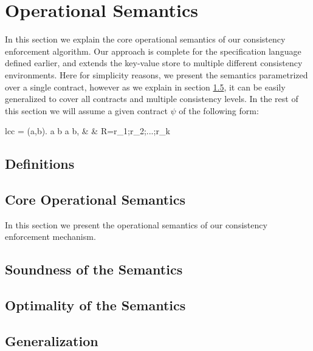 %
%
\section{Operational Semantics}

In this section we explain the core operational semantics of our
consistency enforcement algorithm. 
Our approach is complete for the specification language defined earlier,
and extends the key-value store to multiple different consistency
environments. Here for simplicity reasons, we present the semantics 
parametrized over a single contract,
however as we explain in section \ref{subsec:generalization}, it can be easily
generalized to cover all contracts and multiple consistency levels. In
the rest of this section we will assume a given contract $\psi$ of the
following form:
	\begin{smathpar}
	\begin{array}{lcc}
		\psi = \forall (a,b). a  b  \Rightarrow a
		 b, & \spc & R=r_1;r_2;...;r_k \\
	\end{array}
	\end{smathpar}

\subsection{Definitions}

\subsection{Core Operational Semantics}
In this section we present the operational semantics of our consistency
enforcement mechanism.


\subsection{Soundness of the Semantics}

\subsection{Optimality of the Semantics}

\subsection{Generalization}
\label{subsec:generalization}


